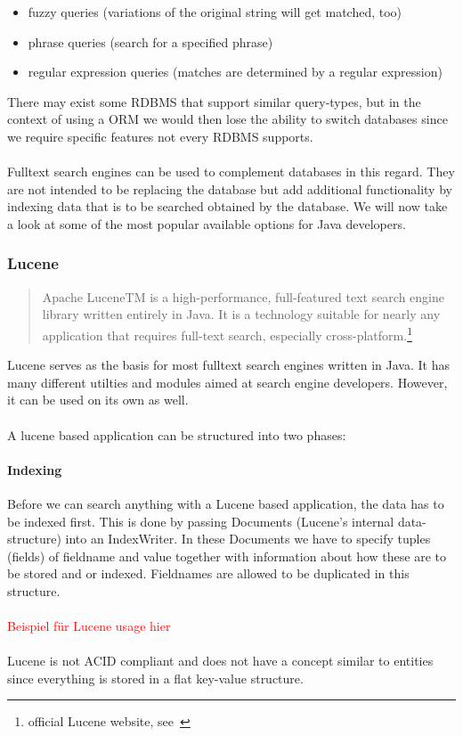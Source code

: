 \begin{itemize}
	\item fuzzy queries (variations of the original string will get matched, too)
	\item phrase queries (search for a specified phrase)
	\item regular expression queries (matches are determined by a regular expression)
\end{itemize}
There may exist some RDBMS that support similar query-types, but in the context of using a ORM we would then lose the ability to switch databases since we require specific features not every RDBMS supports.
\\\\
Fulltext search engines can be used to complement databases in this regard. They are not intended to be replacing the database but add additional functionality by indexing data that is to be searched obtained by the database. We will now take a look at some of the most popular available options for Java developers.

\subsubsection{Lucene}

\begin{quote}
Apache LuceneTM is a high-performance, full-featured text search engine library written entirely in Java. It is a technology suitable for nearly any application that requires full-text search, especially cross-platform.\footnote{official Lucene website, see~\cite{lucene_apache_org}}
\end{quote}
Lucene serves as the basis for most fulltext search engines written in Java. It has many different utilties and modules aimed at search engine developers. However, it can be used on its own as well.
\\\\
A lucene based application can be structured into two phases:

\paragraph{Indexing}
Before we can search anything with a Lucene based application, the data has to be indexed first. This is done by passing Documents (Lucene's internal data-structure) into an IndexWriter. In these Documents we have to specify tuples (fields) of fieldname and value together with information about how these are to be stored and or indexed. Fieldnames are allowed to be duplicated in this structure.
\\\\
\textcolor{red}{Beispiel für Lucene usage hier}
\\\\
Lucene is not ACID compliant and does not have a concept similar to entities since everything is stored in a flat key-value structure.

